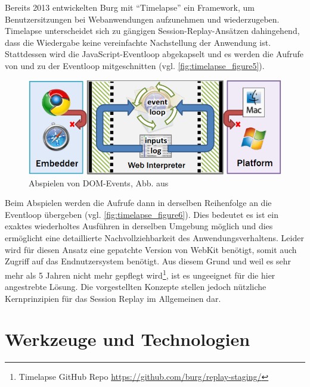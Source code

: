 Bereits 2013 entwickelten Burg \etal \cite{TimelapsePaper} mit \enquote{Timelapse} ein Framework, um Benutzersitzungen bei Webanwendungen aufzunehmen und wiederzugeben. Timelapse unterscheidet sich zu gängigen Session-Replay-Ansätzen dahingehend, dass die Wiedergabe keine vereinfachte Nachstellung der Anwendung ist. Stattdessen wird die JavaScript-Eventloop abgekapselt und es werden die Aufrufe von und zu der Eventloop mitgeschnitten (vgl. \autoref{fig:timelapse_figure5}).

\begin{figure}
\centering
\includegraphics[width=\linewidth]{img/03_methoden/timelapse_figure6.png}
\caption{Abspielen von DOM-Events, Abb. aus \cite{TimelapsePaper}}
\label{fig:timelapse_figure6}
\end{figure}

Beim Abspielen werden die Aufrufe dann in derselben Reihenfolge an die Eventloop übergeben (vgl. \autoref{fig:timelapse_figure6}). Dies bedeutet es ist ein exaktes wiederholtes Ausführen in derselben Umgebung möglich und dies ermöglicht eine detaillierte Nachvollziehbarkeit des Anwendungsverhaltens. Leider wird für diesen Ansatz eine gepatchte Version von WebKit benötigt, somit auch Zugriff auf das Endnutzersystem benötigt. Aus diesem Grund und weil es sehr mehr als 5 Jahren nicht mehr gepflegt wird\footnote{Timelapse GitHub Repo \url{https://github.com/burg/replay-staging/}}, ist es ungeeignet für die hier angestrebte Lösung. Die vorgestellten Konzepte stellen jedoch nützliche Kernprinzipien für das Session Replay im Allgemeinen dar.

\section{Werkzeuge und Technologien}
\label{sec:werkzeuge-und-technologien}

%
%


